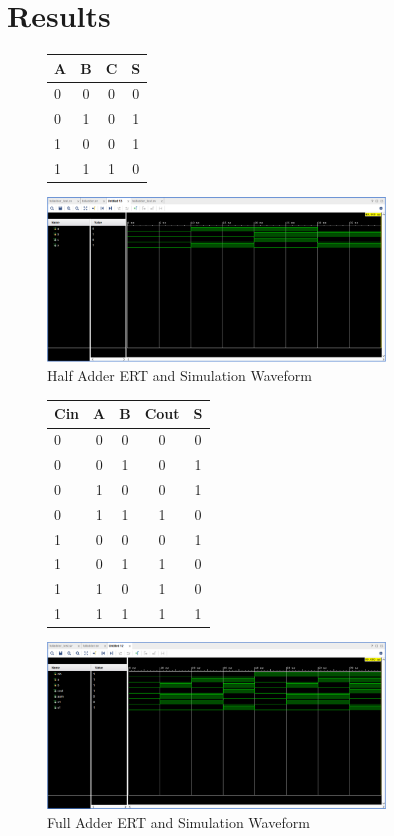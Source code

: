 \documentclass[11pt]{article}
\begin{document}
\section*{Results}
\begin{figure}\centering
	\begin{tabular}{l|c||c|c}
		A & B & C & S \\
		\midrule
		0 & 0 & 0 & 0 \\
		0 & 1 & 0 & 1 \\
		1 & 0 & 0 & 1 \\
		1 & 1 & 1 & 0 \\
		\bottomrule
	\end{tabular} 
	
	\includegraphics[width=0.8\textwidth,trim=0cm 12cm 0.3cm 1.5cm,clip]{half_adder_simwave}
	\caption{Half Adder ERT and Simulation Waveform}
	\label{fig:sim_with_table_HA}
\end{figure}

\begin{figure}\centering
	\begin{tabular}{l|c|c||c|c}
		Cin & A & B & Cout & S \\
		\midrule
		0 & 0 & 0 & 0 & 0 \\
		0 & 0 & 1 & 0 & 1 \\
		0 & 1 & 0 & 0 & 1 \\
		0 & 1 & 1 & 1 & 0 \\
		1 & 0 & 0 & 0 & 1 \\
		1 & 0 & 1 & 1 & 0 \\
		1 & 1 & 0 & 1 & 0 \\
		1 & 1 & 1 & 1 & 1 \\
		\bottomrule
	\end{tabular} 
	
	\includegraphics[width=0.8\textwidth,trim=0cm 10cm 0.3cm 1.5cm,clip]{full_adder_simwave}
	\caption{Full Adder ERT and Simulation Waveform}
	\label{fig:sim_with_table_FA}
\end{figure}
\end{document}
